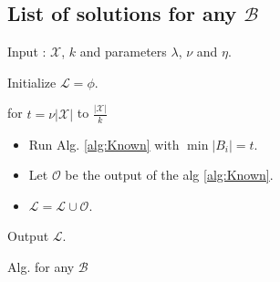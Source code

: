 \documentclass[twoside]{article}
\newcommand{\mc}{\mathcal}
\newenvironment{alg}{
    \begin{list}{}{
        \setlength{\itemsep}{2pt}
        \setlength{\parsep}{0pt}
        \setlength{\parskip}{0pt}
        \setlength{\topsep}{1pt}
    }
}
{
    \end{list}
}
\begin{document}
\subsection{List of solutions for any $\mc B$}
\begin{algorithm}
\begin{alg}
\item[] Input : $\mc X$, $k$ and parameters $\lambda$, $\nu$ and $\eta$.
\item[] Initialize $\mc L = \phi$. 
\item[] for $t = \nu|\mc X|$ to $\frac{|\mc X|}{k}$ 
\begin{itemize}
\item[] Run Alg. \ref{alg:Known} with $\min |B_i| = t$.
\item[] Let $\mc O$ be the output of the alg \ref{alg:Known}.
\item[] $\mc L = \mc L \cup \mc O$.
\end{itemize}
Output $\mc L$.
\label{alg:allB}
\end{alg}
\caption{Alg. for any $\mc B$}
\end{algorithm}




 


\end{document}
